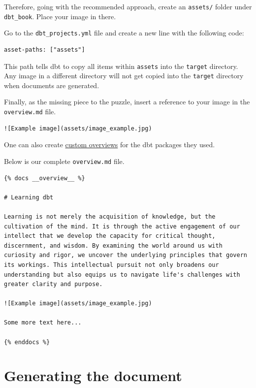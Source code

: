 \documentclass[
]{book}
\begin{document}
Therefore, going with the recommended approach, create an \texttt{assets/} folder under \texttt{dbt\_book}. Place your image in there.

Go to the \texttt{dbt\_projects.yml} file and create a new line with the following code:

\begin{verbatim}
asset-paths: ["assets"]
\end{verbatim}

This path tells dbt to copy all items within \texttt{assets} into the \texttt{target} directory. Any image in a different directory will not get copied into the \texttt{target} directory when documents are generated.

Finally, as the missing piece to the puzzle, insert a reference to your image in the \texttt{overview.md} file.

\begin{verbatim}
![Example image](assets/image_example.jpg)
\end{verbatim}

One can also create \href{https://docs.getdbt.com/docs/build/documentation\#setting-a-custom-overview}{custom overviews} for the dbt packages they used.

Below is our complete \texttt{overview.md} file.

\begin{verbatim}
{% docs __overview__ %}

# Learning dbt

Learning is not merely the acquisition of knowledge, but the cultivation of the mind. It is through the active engagement of our intellect that we develop the capacity for critical thought, discernment, and wisdom. By examining the world around us with curiosity and rigor, we uncover the underlying principles that govern its workings. This intellectual pursuit not only broadens our understanding but also equips us to navigate life's challenges with greater clarity and purpose.

![Example image](assets/image_example.jpg)

Some more text here...

{% enddocs %}
\end{verbatim}

\hypertarget{generating-the-document}{%
\section{Generating the document}\label{generating-the-document}}
\end{document}
